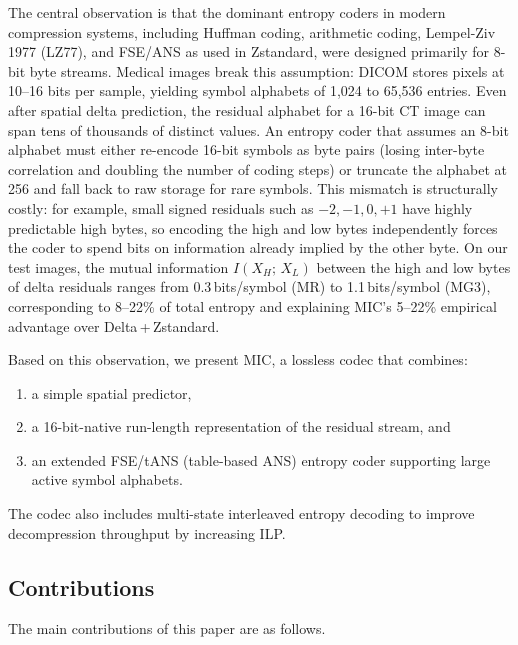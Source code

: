 \documentclass[journal]{IEEEtran}
\begin{document}
The central observation is that the dominant entropy coders in modern
compression systems, including Huffman coding, arithmetic coding, Lempel-Ziv
1977 (LZ77), and FSE/ANS as used in Zstandard, were designed primarily for
8-bit byte streams. Medical images break this assumption: DICOM stores pixels
at 10--16 bits per sample, yielding symbol alphabets of 1,024 to 65,536
entries. Even after spatial delta prediction, the residual alphabet for a
16-bit CT image can span tens of thousands of distinct values. An entropy coder
that assumes an 8-bit alphabet must either re-encode 16-bit symbols as byte
pairs (losing inter-byte correlation and doubling the number of coding steps)
or truncate the alphabet at 256 and fall back to raw storage for rare symbols.
This mismatch is structurally costly: for example, small signed residuals such
as $-2, -1, 0, +1$ have highly predictable high bytes, so encoding the high
and low bytes independently forces the coder to spend bits on information
already implied by the other byte. On our test images, the mutual information
$I(X_H;\,X_L)$ between the high and low bytes of delta residuals ranges from
0.3\,bits/symbol (MR) to 1.1\,bits/symbol (MG3), corresponding to 8--22\% of
total entropy and explaining MIC's 5--22\% empirical advantage over
Delta\,+\,Zstandard.

Based on this observation, we present MIC, a lossless codec that combines:
\begin{enumerate}
  \item a simple spatial predictor,
  \item a 16-bit-native run-length representation of the residual stream, and
  \item an extended FSE/tANS (table-based ANS) entropy coder supporting large
  active symbol alphabets.
\end{enumerate}

The codec also includes multi-state interleaved entropy decoding to improve
decompression throughput by increasing ILP.

\subsection{Contributions}

The main contributions of this paper are as follows.
\end{document}
